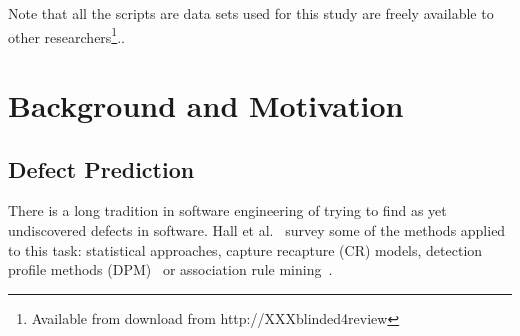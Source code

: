 \documentclass[10pt,conference]{IEEEtran}
\theoremstyle{break}
\theoremstyle{break}
\begin{document}
Note that all the  scripts are data sets
used for this study are freely available
to other researchers\footnote{Available from download from http://XXXblinded4review}..


 



 


\section{Background and Motivation}

\subsection{Defect Prediction}
\label{sect:review}

There is a long tradition in software engineering of trying to find
as yet undiscovered defects in software. 
Hall et al.~\cite{hall2012systematic} survey some of the methods
applied to this task: statistical approaches, capture recapture 
(CR) models, detection profile methods (DPM)~\cite{song2011general} or
association rule mining~\cite{song2006software}. 
\end{document}
